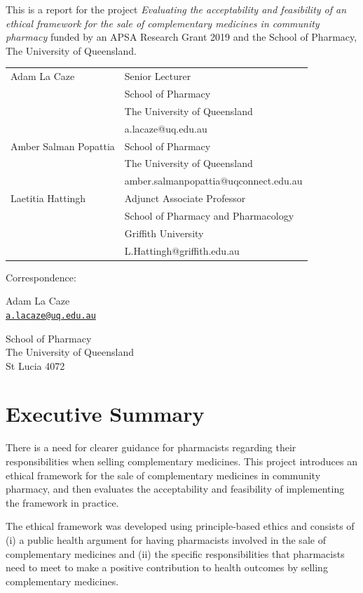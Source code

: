 \documentclass[12pt,]{article}
\author{}
\date{\vspace{-2.5em}}
\begin{document}


This is a report for the project \emph{Evaluating the acceptability and
feasibility of an ethical framework for the sale of complementary
medicines in community pharmacy} funded by an APSA Research Grant 2019
and the School of Pharmacy, The University of Queensland.

\bigskip

\bigskip

\begin{tabular}{ll} Adam La Caze & Senior Lecturer\tabularnewline
& School of Pharmacy\tabularnewline
& The University of Queensland\tabularnewline
& a.lacaze@uq.edu.au\tabularnewline[10pt] Amber Salman Popattia & School of Pharmacy\tabularnewline
& The University of Queensland\tabularnewline
& amber.salmanpopattia@uqconnect.edu.au\tabularnewline[10pt] Laetitia Hattingh & Adjunct Associate Professor\tabularnewline
& School of Pharmacy and Pharmacology\tabularnewline
& Griffith University\tabularnewline
& L.Hattingh@griffith.edu.au\tabularnewline
\end{tabular}

\bigskip

Correspondence:

Adam La Caze\\
\href{mailto:a.lacaze@uq.edu.au}{\nolinkurl{a.lacaze@uq.edu.au}}

School of Pharmacy\\
The University of Queensland\\
St Lucia 4072

\newpage

\section*{Executive Summary}\label{executive-summary}

There is a need for clearer guidance for pharmacists regarding their
responsibilities when selling complementary medicines. This project
introduces an ethical framework for the sale of complementary medicines
in community pharmacy, and then evaluates the acceptability and
feasibility of implementing the framework in practice.

The ethical framework was developed using principle-based ethics and
consists of (i) a public health argument for having pharmacists involved
in the sale of complementary medicines and (ii) the specific
responsibilities that pharmacists need to meet to make a positive
contribution to health outcomes by selling complementary medicines.
\end{document}
